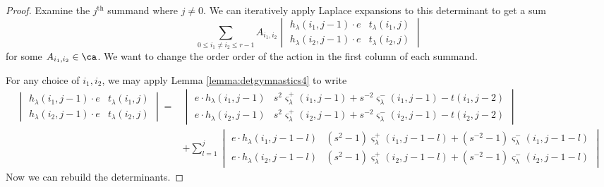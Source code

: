 \begin{proof}
Examine the $j^{\textrm{th}}$ summand where $j \neq 0$. We can iteratively apply Laplace expansions to this determinant to get a sum
\[
\sum_{0 \leq i_1 \neq i_2 \leq r-1} A_{i_1, i_2} 
\begin{vmatrix}
h_\lambda (i_1, j-1)\cdot e & t_\lambda (i_1, j) \\
h_\lambda (i_2, j-1)\cdot e & t_\lambda (i_2, j)
\end{vmatrix} 
\]
for some $A_{i_1, i_2} \in \ca$. We want to change the order order of the action in the first column of each summand.

For any choice of $i_1, i_2$, we may apply Lemma \ref{lemma:detgymnastics4} to write
\begin{align*}
\begin{vmatrix}
h_\lambda (i_1, j-1)\cdot e & t_\lambda (i_1, j) \\
h_\lambda (i_2, j-1)\cdot e & t_\lambda (i_2, j)
\end{vmatrix} 
=&
\begin{vmatrix}
e \cdot h_\lambda (i_1, j-1) & s^2 \varsigma_\lambda^+ (i_1, j-1) + s^{-2} \varsigma_\lambda^- (i_1, j-1) - t(i_1, j-2) \\
e \cdot h_\lambda (i_2, j-1) & s^2 \varsigma_\lambda^+ (i_2, j-1) + s^{-2} \varsigma_\lambda^- (i_2, j-1) - t(i_2, j-2) 
\end{vmatrix}\\
&+
\sum_{l=1}^{j}
\begin{vmatrix}
e \cdot h_\lambda(i_1, j-1-l) & (s^2 - 1) \varsigma_\lambda^+ (i_1, j-1-l) + (s^{-2} - 1) \varsigma_\lambda^- (i_1, j-1-l) \\
e \cdot h_\lambda(i_2, j-1-l) & (s^2 - 1) \varsigma_\lambda^+ (i_2, j-1-l) + (s^{-2} - 1) \varsigma_\lambda^- (i_2, j-1-l) 
\end{vmatrix}
\end{align*}
Now we can rebuild the determinants.
\end{proof}






